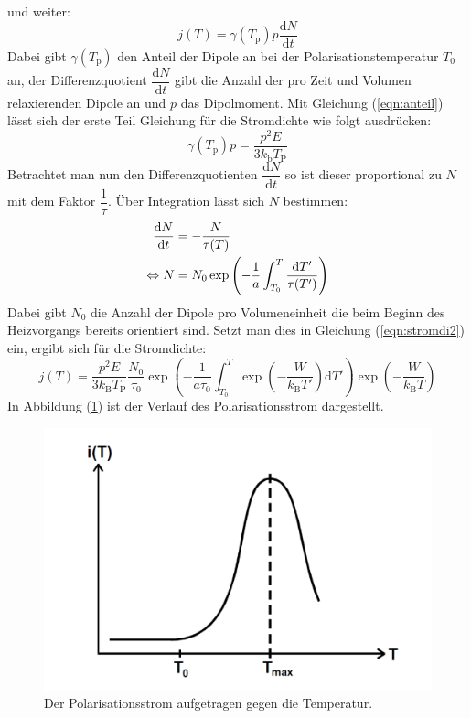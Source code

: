 und weiter:
\begin{equation}
  \label{eqn:stromdichte}
  j(T)=\gamma(T_\mathrm{p})p\dfrac{\mathrm{d} N}{\mathrm{d} t}
\end{equation}
Dabei gibt $\gamma(T_\mathrm{p})$ den Anteil der Dipole an bei der Polarisationstemperatur $T_\mathrm{0}$ an, der Differenzquotient $\dfrac{\mathrm{d} N}{\mathrm{d} t}$ gibt die Anzahl der pro Zeit und Volumen relaxierenden Dipole an und
$p$ das Dipolmoment.
Mit Gleichung (\ref{eqn:anteil}) lässt sich der erste Teil Gleichung für die Stromdichte wie folgt ausdrücken:
\begin{equation}
  \label{eqn:stromdi2}
  \gamma(T_\mathrm{p})p=\dfrac{p^2E}{3 k_\mathrm{b} T_\mathrm{P}}
\end{equation}
Betrachtet man nun den Differenzquotienten $\dfrac{\mathrm{d} N}{\mathrm{d} t}$ so ist dieser proportional zu $N$ mit dem Faktor $\dfrac{1}{\tau}$. Über Integration lässt sich $N$ bestimmen:
\begin{align}
  \dfrac{\mathrm{d} N}{\mathrm{d} t}&=-\dfrac{N}{\tau(T)} \notag \\
  \label{eqn:einset}
  \Leftrightarrow N&=N_\mathrm{0}\exp\left(-\dfrac{1}{a}\int_{T_0}^T\dfrac{\mathrm{d} T'}{\tau(T')}\right)
\end{align}
Dabei gibt $N_\mathrm{0}$ die Anzahl der Dipole pro Volumeneinheit die beim Beginn des Heizvorgangs bereits orientiert sind. Setzt man dies in Gleichung (\ref{eqn:stromdi2}) ein, ergibt sich für die Stromdichte:
\begin{equation}
  \label{eqn:stromdi3}
  j(T) = \dfrac{p^2 E}{3k_\mathrm{B}T_\mathrm{P}}\dfrac{N_\mathrm{0}}{\tau_\mathrm{0}} \exp{\left(-\dfrac{1}{a\tau_\mathrm{0}}\int_{T_0}^T\exp{\left(-\dfrac{W}{k_\mathrm{B}T'}\right)\mathrm{d}T'}\right)}\exp{\left(-\dfrac{W}{ k_\mathrm{B}T}\right)}
\end{equation}
In Abbildung (\ref{fig:stromdi}) ist der Verlauf des Polarisationsstrom dargestellt.
\begin{figure}[h!]
  \centering
  \includegraphics[scale=0.5]{fig/stromver.png}
  \caption{Der Polarisationsstrom aufgetragen gegen die Temperatur.}
  \label{fig:stromdi}
\end{figure}
